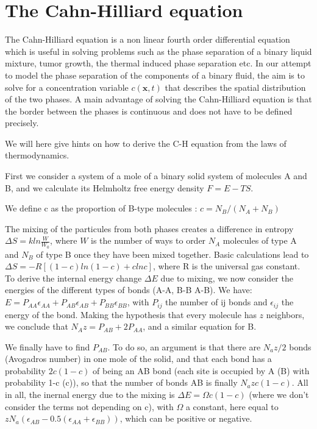 \documentclass{article}
\begin{document}
\section{The Cahn-Hilliard equation}
The Cahn-Hilliard equation is a non linear fourth order differential equation which is useful in solving problems such as the phase separation of a binary liquid mixture, tumor growth, the thermal induced phase separation etc. In our attempt to model the phase separation of the components of a binary fluid, the aim is to solve for a concentration variable $c(\mathbf{x}, t)$ that describes the spatial distribution of the two phases. A main advantage of solving the Cahn-Hilliard equation is that the border between the phases is continuous and does not have to be defined precisely.

We will here give hints on how to derive the C-H equation from the laws of thermodynamics.

First we consider a system of a mole of a binary solid system of molecules A and B, and we calculate its Helmholtz free energy density $F=E-TS$.

We define c as the proportion of B-type molecules : $c=N_B/(N_A+N_B)$

The mixing of the particules from both phases creates a difference in entropy $\Delta S=kln\frac{W}{W_0}$, where $W$ is the number of ways to order $N_A$ molecules of type A and $N_B$ of type B once they have been mixed together. Basic calculations lead to $\Delta S=-R[(1-c)ln(1-c)+c  ln c]$, where R is the universal gas constant.\\

To derive the internal energy change $\Delta E$ due to mixing, we now consider the energies of the different types of bonds (A-A, B-B A-B). 
We have: $E=P_{AA}\epsilon_{AA}+P_{AB}\epsilon_{AB}+P_{BB}\epsilon_{BB}$, with $P_{ij}$ the number of ij bonds and $\epsilon_{ij}$ the energy of the bond. Making the hypothesis that every molecule has $z$ neighbors, we conclude that $N_Az=P_{AB}+2P_{AA}$, and a similar equation for B.

We finally have to find $P_{AB}$. To do so, an argument is that there are $N_az/2$ bonds (Avogadros number) in one mole of the solid, and that each bond has a probability $2c(1-c)$ of being an AB bond (each site is occupied by A (B) with probability 1-c (c)), so that the number of bonds AB is finally $N_azc(1-c)$. All in all, the inernal energy due to the mixing is $\Delta E=\Omega c(1-c)$ (where we don't consider the terms not depending on c), with $\Omega$ a constant, here equal to $zN_a(\epsilon_{AB}-0.5(\epsilon_{AA}+\epsilon_{BB}))$, which can be positive or negative.\\
\end{document}
